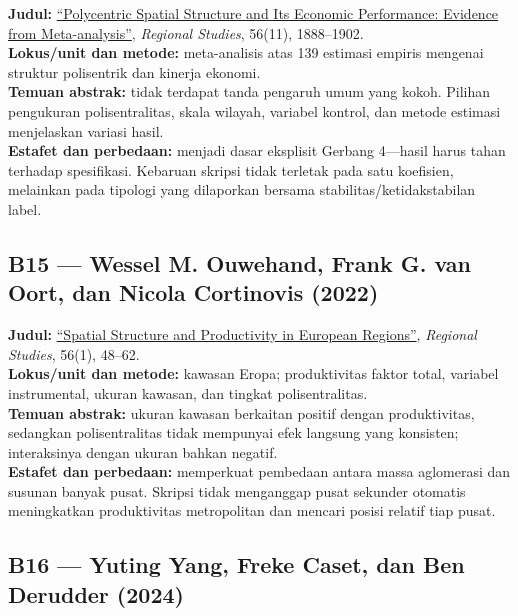 \documentclass[
  indonesian,
  11pt,
  a4paper,
  oneside,
  openany]{report}
\begin{document}
\textbf{Judul:}
\href{https://doi.org/10.1080/00343404.2021.2012142}{``Polycentric
Spatial Structure and Its Economic Performance: Evidence from
Meta-analysis''}, \emph{Regional Studies}, 56(11), 1888--1902.\\
\textbf{Lokus/unit dan metode:} meta-analisis atas 139 estimasi empiris
mengenai struktur polisentrik dan kinerja ekonomi.\\
\textbf{Temuan abstrak:} tidak terdapat tanda pengaruh umum yang kokoh.
Pilihan pengukuran polisentralitas, skala wilayah, variabel kontrol, dan
metode estimasi menjelaskan variasi hasil.\\
\textbf{Estafet dan perbedaan:} menjadi dasar eksplisit Gerbang
4---hasil harus tahan terhadap spesifikasi. Kebaruan skripsi tidak
terletak pada satu koefisien, melainkan pada tipologi yang dilaporkan
bersama stabilitas/ketidakstabilan label.

\subsection{B15 --- Wessel M. Ouwehand, Frank G. van Oort, dan Nicola
Cortinovis
(2022)}\label{b15-wessel-m.-ouwehand-frank-g.-van-oort-dan-nicola-cortinovis-2022}

\textbf{Judul:}
\href{https://doi.org/10.1080/00343404.2021.1950912}{``Spatial Structure
and Productivity in European Regions''}, \emph{Regional Studies}, 56(1),
48--62.\\
\textbf{Lokus/unit dan metode:} kawasan Eropa; produktivitas faktor
total, variabel instrumental, ukuran kawasan, dan tingkat
polisentralitas.\\
\textbf{Temuan abstrak:} ukuran kawasan berkaitan positif dengan
produktivitas, sedangkan polisentralitas tidak mempunyai efek langsung
yang konsisten; interaksinya dengan ukuran bahkan negatif.\\
\textbf{Estafet dan perbedaan:} memperkuat pembedaan antara massa
aglomerasi dan susunan banyak pusat. Skripsi tidak menganggap pusat
sekunder otomatis meningkatkan produktivitas metropolitan dan mencari
posisi relatif tiap pusat.

\subsection{B16 --- Yuting Yang, Freke Caset, dan Ben Derudder
(2024)}\label{b16-yuting-yang-freke-caset-dan-ben-derudder-2024}
\end{document}
